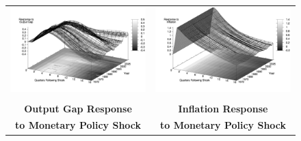 \documentclass[12pt]{article}
\begin{document}
{\begin{figure}
\begin{tabular}{cc}
\includegraphics[scale=0.12]{images/Irf16_Output_Gap_Cost_Shock.png} & \includegraphics[scale=0.12]{images/Irf16_Inflation_Cost_Shock.png} \\\\
\textbf{Output Gap Response} & \textbf{Inflation Response} \\
\textbf{to Monetary Policy Shock} & \textbf{to Monetary Policy Shock}  \\

\end{tabular}
\end{figure}}
\end{document}
